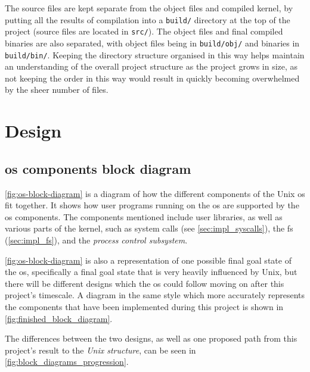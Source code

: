 \documentclass{article}
\begin{document}
The source files are kept separate from the object files and compiled kernel,
by putting all the results of compilation into a \texttt{build/} directory at
the top of the project (source files are located in \texttt{src/}). The object
files and final compiled binaries are also separated, with object files being
in \texttt{build/obj/} and binaries in \texttt{build/bin/}. Keeping the
directory structure organised in this way helps maintain an understanding of
the overall project structure as the project grows in size, as not keeping the
order in this way would result in quickly becoming overwhelmed by the sheer
number of files.

\section{Design}
\subsection{\texorpdfstring{\gls{os}}{OS} components block diagram}
\autoref{fig:os-block-diagram} is a diagram of how the different components of
the Unix \gls{os} fit together. It shows how user programs running on the
\gls{os} are supported by the \gls{os} components. The components mentioned
include user libraries, as well as various parts of the kernel, such as system
calls (see \autoref{sec:impl_syscalls}), the \gls{fs} (\autoref{sec:impl_fs}),
and the \emph{process control subsystem}.

\autoref{fig:os-block-diagram} is also a representation of one possible final
goal state of the \gls{os}, specifically a final goal state that is very
heavily influenced by Unix, but there will be different designs which the
\gls{os} could follow moving on after this project's timescale. A diagram in
the same style which more accurately represents the components that have been
implemented during this project is shown in
\autoref{fig:finished_block_diagram}.

The differences between the two designs, as well as one proposed path from this
project's result to the \emph{Unix structure}, can be seen in
\autoref{fig:block_diagrams_progression}.
\end{document}
